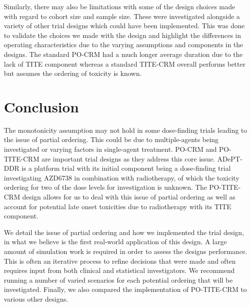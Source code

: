 Similarly, there may also be limitations with some of the design choices made with regard to cohort size and sample size. These were investigated alongside a variety of other trial designs which could have been implemented. This was done to validate the choices we made with the design and highlight the differences in operating characteristics due to the varying assumptions and components in the designs. The standard PO-CRM had a much longer average duration due to the lack of TITE component whereas a standard TITE-CRM overall performs better but assumes the ordering of toxicity is known. 



\section{Conclusion}  
\label{section2.6}

The monotonicity assumption may not hold in some dose-finding trials leading to the issue of partial ordering. This could be due to multiple-agents being investigated or varying factors in single-agent treatment. PO-CRM and PO-TITE-CRM are important trial designs as they address this core issue. ADePT-DDR is a platform trial with its initial component being a dose-finding trial investigating AZD6738 in combination with radiotherapy, of which the toxicity ordering for two of the dose levels for investigation is unknown. The PO-TITE-CRM design allows for us to deal with this issue of partial ordering as well as account for potential late onset toxicities due to radiotherapy with its TITE component. 

We detail the issue of partial ordering and how we implemented the trial design, in what we believe is the first real-world application of this design. A large amount of simulation work is required in order to assess the designs performance. This is often an iterative process to refine decisions that were made and often requires input from both clinical and statistical investigators. We recommend running a number of varied scenarios for each potential ordering that will be investigated. Finally, we also compared the implementation of PO-TITE-CRM to various other designs. 

